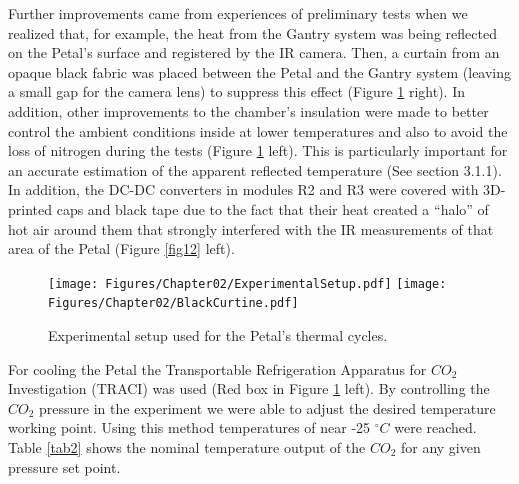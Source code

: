 		Further improvements came from experiences of preliminary tests when we realized that, for example, the heat from the Gantry system was being reflected on the Petal's surface and registered by the IR camera. Then, a curtain from an opaque black fabric was placed between the Petal and the Gantry system (leaving a small gap for the camera lens) to suppress this effect (Figure \ref{fig11} right). In addition, other improvements to the chamber's insulation were made to better control the ambient conditions inside at lower temperatures and also to avoid the loss of nitrogen during the tests (Figure \ref{fig11} left). This is particularly important for an accurate estimation of the apparent reflected temperature (See section 3.1.1). In addition, the DC-DC converters in modules R2 and R3 were covered with 3D-printed caps and black tape due to the fact that their heat created a “halo” of hot air around them that strongly interfered with the IR measurements of that area of the Petal (Figure \ref{fig12} left).
		
		\begin{figure}[ht!]
			\centering
			\captionsetup{justification=centering,margin=2cm}
			\texttt{[image: Figures/Chapter02/ExperimentalSetup.pdf]}
			\texttt{[image: Figures/Chapter02/BlackCurtine.pdf]}
			\caption{\label{fig11} Experimental setup used for the Petal's thermal cycles.}
		\end{figure}
		
		For cooling the Petal the Transportable Refrigeration Apparatus for $CO_{2}$ Investigation (TRACI) was used (Red box in Figure \ref{fig11} left). By controlling the $CO_{2}$ pressure in the experiment we were able to adjust the desired temperature working point. Using this method temperatures of near -25 $^{\circ}C$ were reached. Table \ref{tab2} shows the nominal temperature output of the $CO_{2}$ for any given pressure set point.
		
